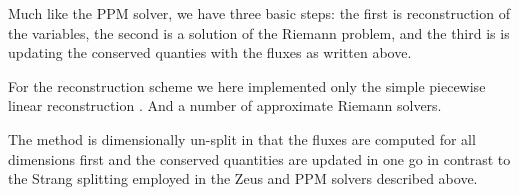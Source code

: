 Much like the PPM solver, we have three basic steps: the first is
reconstruction of the variables, the second is a solution of the
Riemann problem, and the third is is updating the conserved quanties
with the fluxes as written above.

For the reconstruction scheme we here implemented only the simple
piecewise linear reconstruction \citep{1979JCoPh..32..101V}.
And a number of approximate Riemann
solvers. 

The method is dimensionally un-split in that the fluxes are computed
for all dimensions first and the conserved quantities are updated in
one go in contrast to the Strang splitting employed in the Zeus and
PPM solvers described above. 
